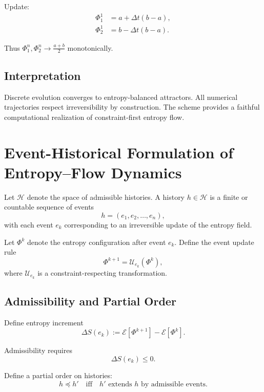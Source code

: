 \documentclass[11pt]{article}
\begin{document}
Update:
\begin{align}
\Phi_1^1 &= a + \Delta t (b-a), \\
\Phi_2^1 &= b - \Delta t (b-a).
\end{align}

Thus $\Phi_1^n,\Phi_2^n \to \frac{a+b}{2}$ monotonically.

\subsection*{Interpretation}

Discrete evolution converges to entropy-balanced attractors.
All numerical trajectories respect irreversibility by construction.
The scheme provides a faithful computational realization of
constraint-first entropy flow.

\section{Event-Historical Formulation of Entropy--Flow Dynamics}

Let $\mathcal{H}$ denote the space of admissible histories.
A history $h \in \mathcal{H}$ is a finite or countable sequence of events
\begin{equation}
h = (e_1, e_2, \dots, e_n),
\end{equation}
with each event $e_k$ corresponding to an irreversible update of the entropy field.

Let $\Phi^k$ denote the entropy configuration after event $e_k$.
Define the event update rule
\begin{equation}
\Phi^{k+1} = \mathcal{U}_{e_k}(\Phi^k),
\end{equation}
where $\mathcal{U}_{e_k}$ is a constraint-respecting transformation.

\subsection*{Admissibility and Partial Order}

Define entropy increment
\begin{equation}
\Delta S(e_k) := \mathcal{E}[\Phi^{k+1}] - \mathcal{E}[\Phi^k].
\end{equation}

Admissibility requires
\begin{equation}
\Delta S(e_k) \le 0.
\end{equation}

Define a partial order on histories:
\begin{equation}
h \preceq h'
\quad \text{iff} \quad
h' \text{ extends } h \text{ by admissible events}.
\end{equation}
\end{document}
